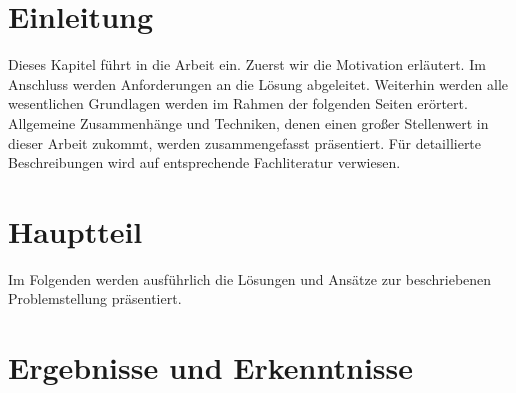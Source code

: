 \documentclass[a4paper,12pt,fleqn]{scrbook}
\begin{document}
\frontmatter 

\setlength{\headheight}{36pt}



\tableofcontents 
%

%


\mainmatter 
\chapter{Einleitung}
Dieses Kapitel führt in die Arbeit ein. Zuerst wir die Motivation erläutert. Im Anschluss werden Anforderungen an die Lösung abgeleitet. Weiterhin werden alle wesentlichen Grundlagen werden im Rahmen der folgenden Seiten erörtert. Allgemeine Zusammenhänge und Techniken, denen einen großer Stellenwert in dieser Arbeit zukommt, werden zusammengefasst präsentiert. Für detaillierte Beschreibungen wird auf entsprechende Fachliteratur verwiesen.
%

%
\chapter{Hauptteil}
Im Folgenden werden ausführlich die Lösungen und Ansätze zur beschriebenen Problemstellung präsentiert.
%

%
\chapter{Ergebnisse und Erkenntnisse}
\lipsum[1]

%
\end{document}
